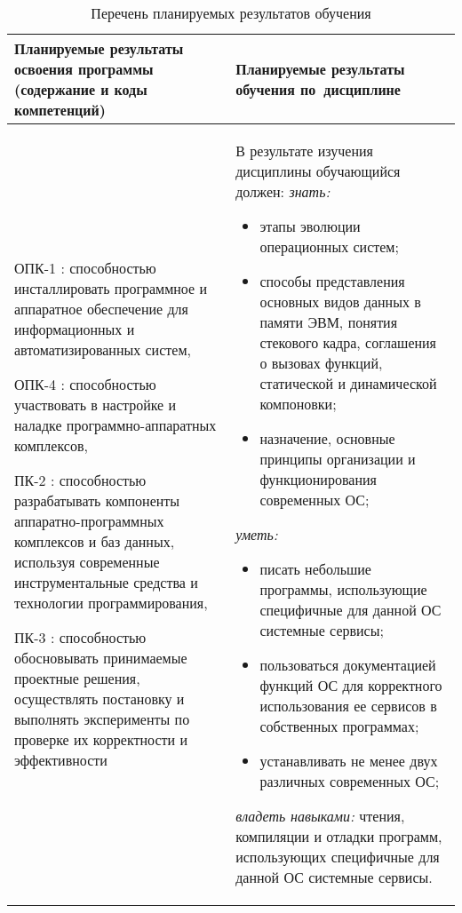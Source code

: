 \documentclass[a4paper,12pt]{article}
\begin{document}
\begin{longtable}{|p{54mm}|p{100mm}|}
  \caption{Перечень планируемых результатов обучения}\\
  \hline
  \centering
  Планируемые результаты освоения программы (содержание и коды компетенций) & 
  \centering\arraybackslash
  Планируемые результаты обучения по~дисциплине
  \\
  \hline
  \endhead
  
  ОПК-1 : способностью инсталлировать программное и аппаратное обеспечение для информационных и автоматизированных систем, \par 
  
  ОПК-4 : способностью участвовать в настройке и наладке программно-аппаратных комплексов, \par 
  
  ПК-2 : способностью разрабатывать компоненты аппаратно-программных комплексов и баз данных, используя современные инструментальные средства и технологии программирования, \par 
  
  ПК-3 : способностью обосновывать принимаемые проектные решения, осуществлять постановку и выполнять эксперименты по проверке их корректности и эффективности
  & 
  В результате изучения дисциплины обучающийся должен:\newline
  \emph{знать:}
  \begin{itemize}[leftmargin=12pt]
    \item этапы эволюции операционных систем; 
    \item способы представления основных видов данных в памяти ЭВМ, понятия стекового кадра, соглашения о вызовах функций, статической и динамической компоновки; 
    \item назначение, основные принципы организации и функционирования современных ОС; 
  \end{itemize}
  

  \emph{уметь:}
  \begin{itemize}[leftmargin=12pt]
    \item писать небольшие программы, использующие специфичные для данной ОС системные сервисы; 
    \item пользоваться документацией функций ОС для корректного использования ее сервисов в собственных программах; 
    \item устанавливать не менее двух различных современных ОС; 
  \end{itemize}
  

  \emph{владеть навыками:}
  чтения, компиляции и отладки программ, использующих специфичные для данной ОС системные сервисы.
  
  \\
  \hline
  \end{longtable}
\end{document}
